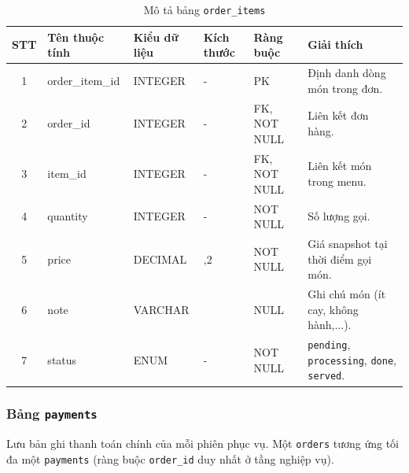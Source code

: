 \documentclass[../DoAn.tex]{subfiles}
\begin{document}
\begin{table}[H]
\centering
\renewcommand{\arraystretch}{1.3}
\small
\begin{tabularx}{\textwidth}{|c|>{\RaggedRight\arraybackslash}p{2.9cm}|>{\Centering\arraybackslash}p{2.2cm}|>{\Centering\arraybackslash}p{1.3cm}|>{\Centering\arraybackslash}p{2.2cm}|>{\RaggedRight\arraybackslash}X|}
\hline
\textbf{STT} & \textbf{Tên thuộc tính} & \textbf{Kiểu dữ liệu} & \textbf{Kích thước} & \textbf{Ràng buộc} & \textbf{Giải thích} \\
\hline
1 & order\_item\_id & INTEGER & - & PK & Định danh dòng món trong đơn. \\ \hline
2 & order\_id & INTEGER & - & FK, NOT NULL & Liên kết đơn hàng. \\ \hline
3 & item\_id & INTEGER & - & FK, NOT NULL & Liên kết món trong menu. \\ \hline
4 & quantity & INTEGER & - & NOT NULL & Số lượng gọi. \\ \hline
5 & price & DECIMAL & 10,2 & NOT NULL & Giá snapshot tại thời điểm gọi món. \\ \hline
6 & note & VARCHAR & 200 & NULL & Ghi chú món (ít cay, không hành,...). \\ \hline
7 & status & ENUM & - & NOT NULL & \texttt{pending}, \texttt{processing}, \texttt{done}, \texttt{served}. \\ \hline
\end{tabularx}
\caption{Mô tả bảng \texttt{order\_items}}
\end{table}

\subsubsection{Bảng \texttt{payments}}

Lưu bản ghi thanh toán chính của mỗi phiên phục vụ. Một \texttt{orders} tương ứng tối đa một \texttt{payments}
(ràng buộc \texttt{order\_id} duy nhất ở tầng nghiệp vụ).
\end{document}
